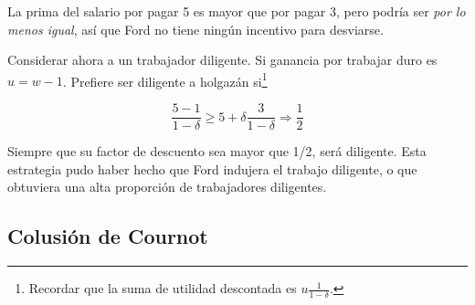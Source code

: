 \documentclass[12pt]{scrartcl}
\begin{document}
La prima del salario por pagar 5 es mayor que por pagar 3, pero podría ser \textit{por lo menos igual}, así que Ford no tiene ningún incentivo para desviarse.

Considerar ahora a un trabajador diligente. Si ganancia por trabajar duro es $u=w - 1$. Prefiere ser diligente a holgazán si\footnote{
Recordar que la suma de utilidad descontada es $u\frac{1}{1-\delta}$.
}

\[ 
    \frac{5-1}{1-\delta} \geq 5 + \delta \frac{3}{1-\delta} \Longrightarrow \frac{1}{2}
\]

Siempre que su factor de descuento sea mayor que 1/2, será diligente. Esta estrategia pudo haber hecho que Ford indujera el trabajo diligente, o que obtuviera una alta proporción de trabajadores diligentes.

\subsection{Colusión de Cournot}

\end{document}
